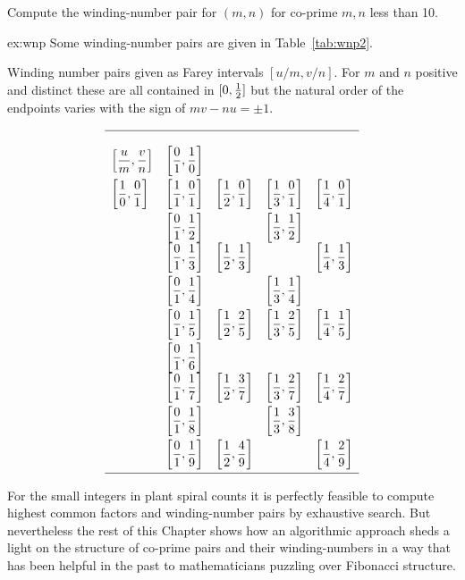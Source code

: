 \begin{jExercise}\label{ex:wnp}
	Compute the winding-number pair for $(m,n)$ for co-prime $m,n$ less than 10. 
\end{jExercise}
\begin{jAnswer}{ex:wnp}
	Some winding-number pairs are given in Table~\ref{tab:wnp2}.
	\begin{table}
	\caption{Winding number pairs given as Farey intervals $[u/m,v/n]$. For $m$ and $n$ positive and distinct these are all contained in $[0,\textstyle{\frac{1}{2}}]$ but the natural order of the endpoints varies with the sign of $mv-nu=\pm 1$.}
\label{tab:wnp2}
	\begin{equation*}
		\begin{array}{lllll}
			\hline
			\\
			\left[\displaystyle\frac{u}{m},\frac{v}{n}\right]
			&\left[\displaystyle\frac{0}{1},\frac{1}{0}\right]&   &  &   \\[2ex]
			\left[\displaystyle\frac{ 1}{0},\frac{0}{1}\right] &  \left[\displaystyle\frac{1}{1},\frac{0}{1}\right]  &  \left[\displaystyle\frac{1}{2},\frac{0}{1}\right]  & \left[\displaystyle\frac{1}{3},\frac{0}{1}\right]& \left[\displaystyle\frac{1}{4},\frac{0}{1}\right] \\[2ex]
			&  \left[\displaystyle\frac{0}{1},\frac{1}{2}\right]&  & \left[\displaystyle\frac{1}{3},\frac{1}{2}\right] &  \\
			&  \left[\displaystyle\frac{0}{1},\frac{1}{3}\right] & \left[\displaystyle\frac{1}{2},\frac{1}{3}\right] &  & \left[\displaystyle\frac{1}{4},\frac{1}{3}\right] \\[2ex]
			&  \left[\displaystyle\frac{0}{1},\frac{1}{4}\right] &  & \left[\displaystyle\frac{1}{3},\frac{1}{4}\right] & \\[2ex]
			&  \left[\displaystyle\frac{0}{1},\frac{1}{5}\right] &\left[\displaystyle\frac{1}{2},\frac{2}{5}\right] & \left[\displaystyle\frac{1}{3},\frac{2}{5}\right] &\left[\displaystyle\frac{1}{4},\frac{1}{5}\right] \\[2ex]
			&  \left[\displaystyle\frac{0}{1},\frac{1}{6}\right] &  &  &  \\
			&  \left[\displaystyle\frac{0}{1},\frac{1}{7}\right] &\left[\displaystyle\frac{1}{2},\frac{3}{7}\right]& \left[\displaystyle\frac{1}{3},\frac{2}{7}\right] & \left[\displaystyle\frac{1}{4},\frac{2}{7}\right]  \\[2ex]
			&  \left[\displaystyle\frac{0}{1},\frac{1}{8}\right] &  & \left[\displaystyle\frac{1}{3},\frac{3}{8}\right] &  \\[2ex]
			&  \left[\displaystyle\frac{0}{1},\frac{1}{9}\right] & \left[\displaystyle\frac{1}{2},\frac{4}{9}\right] &  & \left[\displaystyle\frac{1}{4},\frac{2}{9}\right]  \\[2ex]
			\hline
		\end{array}
	\end{equation*}
		\end{table}
\end{jAnswer}



For the small integers in plant spiral counts it is perfectly feasible to compute highest common factors and winding-number pairs by exhaustive search. But nevertheless the rest of this Chapter shows how an algorithmic approach sheds a light on the structure of co-prime pairs and their winding-numbers in a way that has been helpful in the past to mathematicians puzzling over Fibonacci structure. 



